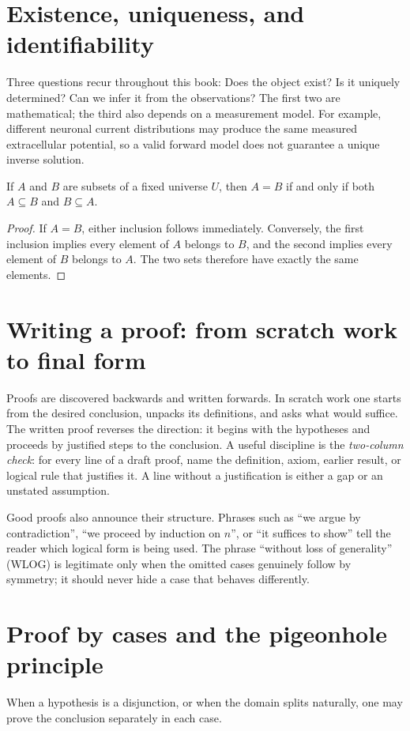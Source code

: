 \section{Existence, uniqueness, and identifiability}
Three questions recur throughout this book: Does the object exist? Is it uniquely determined? Can we infer it from the observations? The first two are mathematical; the third also depends on a measurement model. For example, different neuronal current distributions may produce the same measured extracellular potential, so a valid forward model does not guarantee a unique inverse solution.

\begin{proposition}If $A$ and $B$ are subsets of a fixed universe $U$, then $A=B$ if and only if both $A\subseteq B$ and $B\subseteq A$.\end{proposition}
\begin{proof}If $A=B$, either inclusion follows immediately. Conversely, the first inclusion implies every element of $A$ belongs to $B$, and the second implies every element of $B$ belongs to $A$. The two sets therefore have exactly the same elements.\end{proof}
\section{Writing a proof: from scratch work to final form}
Proofs are discovered backwards and written forwards. In scratch work one starts from the desired conclusion, unpacks its definitions, and asks what would suffice. The written proof reverses the direction: it begins with the hypotheses and proceeds by justified steps to the conclusion. A useful discipline is the \emph{two-column check}: for every line of a draft proof, name the definition, axiom, earlier result, or logical rule that justifies it. A line without a justification is either a gap or an unstated assumption.

Good proofs also announce their structure. Phrases such as ``we argue by contradiction'', ``we proceed by induction on $n$'', or ``it suffices to show'' tell the reader which logical form is being used. The phrase ``without loss of generality'' (WLOG) is legitimate only when the omitted cases genuinely follow by symmetry; it should never hide a case that behaves differently.

\section{Proof by cases and the pigeonhole principle}
When a hypothesis is a disjunction, or when the domain splits naturally, one may prove the conclusion separately in each case.

